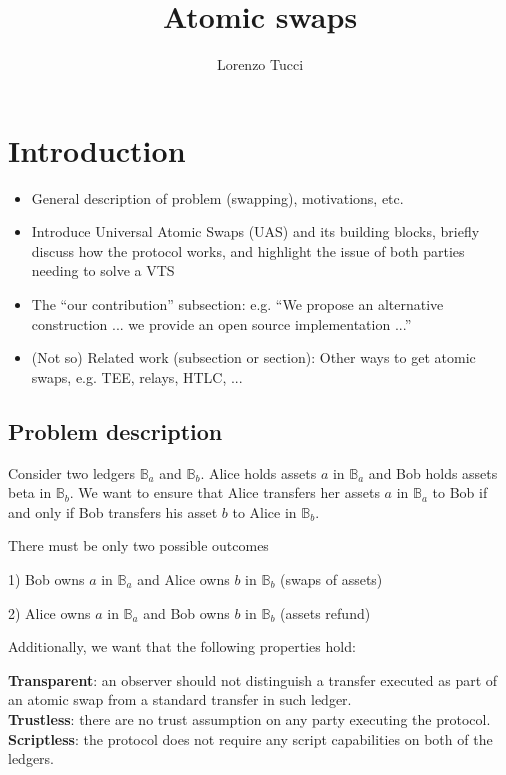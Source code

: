 \documentclass{article}      	%
\begin{document}
         
\author{Lorenzo Tucci}
\title{Atomic swaps}

\maketitle

\tableofcontents
\section{Introduction}

\begin{itemize}
\item General description of problem (swapping), motivations, etc.
\item Introduce Universal Atomic Swaps (UAS) and its building blocks, briefly discuss how the protocol works, and highlight the issue of both parties needing to solve a VTS
\item The ``our contribution'' subsection: e.g. ``We propose an alternative construction ... we provide an open source implementation ...''
\item (Not so) Related work (subsection or section): Other ways to get atomic swaps, e.g. TEE, relays, HTLC, ...
\end{itemize}


\subsection{Problem description}
Consider two ledgers $\mathbb{B}_a$ and $\mathbb{B}_b$. Alice holds assets $a$ in $\mathbb{B}_a$ and Bob holds assets beta in $\mathbb{B}_b$. We want to ensure that Alice transfers her assets $a$ in $\mathbb{B}_a$ to Bob if and only if Bob transfers his asset $b$ to Alice in $\mathbb{B}_b$.

There must be only two possible outcomes

1) Bob owns $a$ in $\mathbb{B}_a$ and Alice owns $b$ in $\mathbb{B}_b$ (swaps of assets)

2) Alice owns $a$ in $\mathbb{B}_a$ and Bob owns $b$ in $\mathbb{B}_b$ (assets refund)

Additionally, we want that the following properties hold: 

\textbf{Transparent}: an observer should not distinguish a transfer executed as part of an atomic swap from a standard transfer in such ledger. \\
\textbf{Trustless}: there are no trust assumption on any party executing the protocol. \\
\textbf{Scriptless}: the protocol does not require any script capabilities on both of the ledgers. \\
\end{document}
